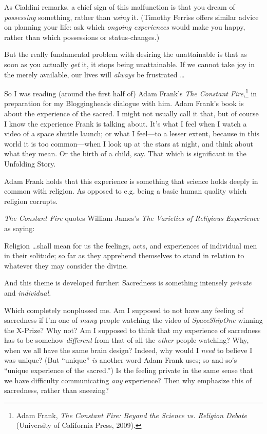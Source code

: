 {
 As Cialdini remarks, a chief sign of this malfunction is that you
dream of \textit{possessing} something, rather than \textit{using} it.
(Timothy Ferriss offers similar advice on planning your life: ask which
\textit{ongoing experiences} would make you happy, rather than which
possessions or status-changes.)}

{
 But the really fundamental problem with desiring the unattainable
is that as soon as you actually \textit{get} it, it stops being
unattainable. If we cannot take joy in the merely available, our lives
will \textit{always} be frustrated \ldots}

\myendsectiontext


\bigskip


{
 So I was reading (around the first half of) Adam
Frank's \textit{The Constant Fire},\footnote{Adam Frank, \textit{The Constant Fire: Beyond the Science vs.
Religion Debate} (University of California Press, 2009).}
in preparation for my Bloggingheads dialogue with him. Adam
Frank's book is about the experience of the sacred. I
might not usually call it that, but of course I know the experience
Frank is talking about. It's what I feel when I watch a
video of a space shuttle launch; or what I feel---to a lesser extent,
because in this world it is too common---when I look up at the stars at
night, and think about what they mean. Or the birth of a child, say.
That which is significant in the Unfolding Story. }

{
 Adam Frank holds that this experience is something that science
holds deeply in common with religion. As opposed to e.g. being a basic
human quality which religion corrupts.}

{
 \textit{The Constant Fire} quotes William James's
\textit{The Varieties of Religious Experience} as saying:}

{
 Religion \ldots shall mean for us the feelings, acts, and
experiences of individual men in their solitude; so far as they
apprehend themselves to stand in relation to whatever they may consider
the divine.}

{
 And this theme is developed further: Sacredness is something
intensely \textit{private} and \textit{individual.}}

{
 Which completely nonplussed me. Am I supposed to not have any
feeling of sacredness if I'm one of \textit{many}
people watching the video of \textit{SpaceShipOne} winning the X-Prize?
Why not? Am I supposed to think that my experience of sacredness has to
be somehow \textit{different} from that of all the \textit{other}
people watching? Why, when we all have the same brain design? Indeed,
why would I \textit{need} to believe I was unique? (But
``unique'' \textit{is} another word
Adam Frank uses; so-and-so's ``unique
experience of the sacred.'') Is the feeling private
in the same sense that we have difficulty communicating \textit{any}
experience? Then why emphasize this of sacredness, rather than
sneezing?}

